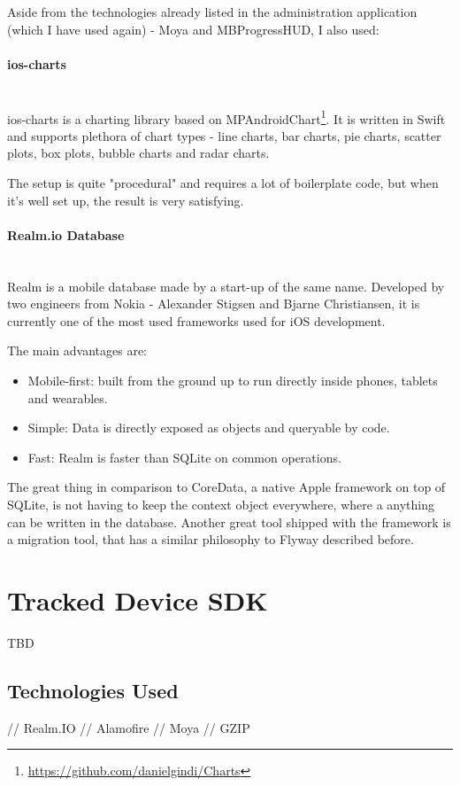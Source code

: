Aside from the technologies already listed in the administration application (which I have used again) - Moya and MBProgressHUD, I also used:

\paragraph{ios-charts}\mbox{}\\

ios-charts is a charting library based on MPAndroidChart\footnote{\url{https://github.com/danielgindi/Charts}}. It is written in Swift and supports plethora of chart types - line charts, bar charts, pie charts, scatter plots, box plots, bubble charts and radar charts.

The setup is quite "procedural" and requires a lot of boilerplate code, but when it's well set up, the result is very satisfying.

\newpage

\paragraph{Realm.io Database}\mbox{}\\

Realm is a mobile database made by a start-up of the same name. Developed by two engineers from Nokia - Alexander Stigsen and Bjarne Christiansen, it is currently one of the most used frameworks used for iOS development. 

The main advantages are:

\begin{itemize}
	\item Mobile-first: built from the ground up to run directly inside phones, tablets and wearables.
	\item Simple: Data is directly exposed as objects and queryable by code.
	\item Fast: Realm is faster than SQLite on common operations.
\end{itemize}

The great thing in comparison to CoreData, a native Apple framework on top of SQLite, is not having to keep the context object everywhere, where a anything can be written in the database. Another great tool shipped with the framework is a migration tool, that has a similar philosophy to Flyway described before.

\section{Tracked Device SDK}

TBD

\subsection{Technologies Used}

// Realm.IO
// Alamofire
// Moya
// GZIP